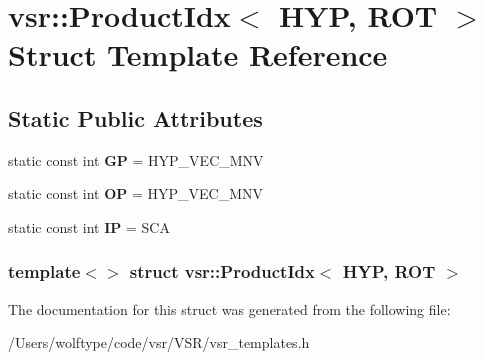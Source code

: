 \hypertarget{structvsr_1_1_product_idx_3_01_h_y_p_00_01_r_o_t_01_4}{\section{vsr\-:\-:Product\-Idx$<$ H\-Y\-P, R\-O\-T $>$ Struct Template Reference}
\label{structvsr_1_1_product_idx_3_01_h_y_p_00_01_r_o_t_01_4}
}
\subsection*{Static Public Attributes}
\begin{DoxyCompactItemize}
\item 
\hypertarget{structvsr_1_1_product_idx_3_01_h_y_p_00_01_r_o_t_01_4_a2f1cdd269ef8fd995732e5ffe9c978de}{static const int {\bfseries G\-P} = H\-Y\-P\-\_\-\-V\-E\-C\-\_\-\-M\-N\-V}\label{structvsr_1_1_product_idx_3_01_h_y_p_00_01_r_o_t_01_4_a2f1cdd269ef8fd995732e5ffe9c978de}

\item 
\hypertarget{structvsr_1_1_product_idx_3_01_h_y_p_00_01_r_o_t_01_4_a9bb88dfc24f1fc9c09d177b9280aa811}{static const int {\bfseries O\-P} = H\-Y\-P\-\_\-\-V\-E\-C\-\_\-\-M\-N\-V}\label{structvsr_1_1_product_idx_3_01_h_y_p_00_01_r_o_t_01_4_a9bb88dfc24f1fc9c09d177b9280aa811}

\item 
\hypertarget{structvsr_1_1_product_idx_3_01_h_y_p_00_01_r_o_t_01_4_abfd6ffef20879a3a0ce17eb02d17784e}{static const int {\bfseries I\-P} = S\-C\-A}\label{structvsr_1_1_product_idx_3_01_h_y_p_00_01_r_o_t_01_4_abfd6ffef20879a3a0ce17eb02d17784e}

\end{DoxyCompactItemize}
\subsubsection*{template$<$$>$ struct vsr\-::\-Product\-Idx$<$ H\-Y\-P, R\-O\-T $>$}



The documentation for this struct was generated from the following file\-:\begin{DoxyCompactItemize}
\item 
/\-Users/wolftype/code/vsr/\-V\-S\-R/vsr\-\_\-templates.\-h\end{DoxyCompactItemize}
